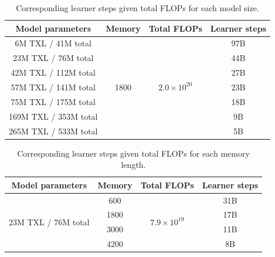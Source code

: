\begin{table}[t!]
  \begin{center}
    \caption{Corresponding learner steps given total FLOPs for each model size.}
    \begin{tabular}{c|c|c|c}
    \label{tab:parameter_scaling_total_flops}
      Model parameters & Memory & Total FLOPs & Learner steps \\
      \hline
      6M TXL / 41M total & \multirow{7}{*}{1800} & \multirow{7}{*}{$2.0 \times 10^{20}$} & 97B\\
      23M TXL / 76M total & & & 44B\\
      42M TXL / 112M total & & & 27B\\
      57M TXL / 141M total & & & 23B\\
      75M TXL / 175M total & & & 18B\\
      169M TXL / 353M total & & & 9B\\
      265M TXL / 533M total & & & 5B\\
    \end{tabular}
  \end{center}
\end{table}

\begin{table}[t!]
  \begin{center}
    \caption{Corresponding learner steps given total FLOPs for each memory length.}
    \begin{tabular}{c|c|c|c}
    \label{tab:memory_scaling_total_flops}
      Model parameters & Memory & Total FLOPs & Learner steps \\
      \hline
      \multirow{4}{*}{23M TXL / 76M total} & 600 & \multirow{4}{*}{$7.9 \times 10^{19}$} & 31B\\
      & 1800 & & 17B\\
      & 3000 & & 11B\\
      & 4200 & & 8B\\
    \end{tabular}
  \end{center}
\end{table}

